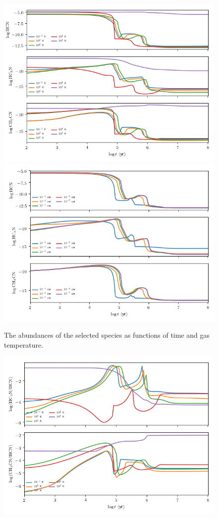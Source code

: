 \documentclass[11pt]{article}
\newenvironment{tight_enumerate}{
    \begin{enumerate}[label=(\alph*)]
    \setlength{\itemsep}{3pt}
    \setlength{\parskip}{0pt}}
    {\end{enumerate}}
\begin{document}
\begin{tight_enumerate}
\begin{figure}[H]
\includegraphics[height=0.45\textheight]{b/t_abundances.png}
\includegraphics[height=0.45\textheight]{b/s_abundances.png}
\caption{The abundances of the selected species as functions of time and gas temperature.}
\end{figure}
\begin{figure}[H]
\centering
\includegraphics[height=0.45\textheight]{b/t_ratios.png}

\end{figure}
\end{tight_enumerate}
\end{document}
